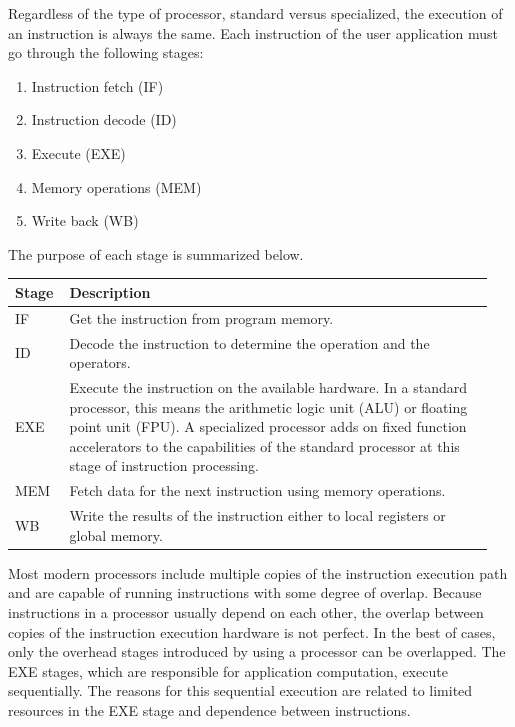 \par Regardless of the type of processor, standard versus specialized, the execution of an
instruction is always the same. Each instruction of the user application must go through the
following stages:
\begin{enumerate}
  \item Instruction fetch (IF)
  \item Instruction decode (ID)
  \item Execute (EXE)
  \item Memory operations (MEM)
  \item Write back (WB)
\end{enumerate}
The purpose of each stage is summarized below.
\begin{table}[H]
  \begin{tabular}{|p{0.1\linewidth} | p{0.85\linewidth}|}
  \hline
  \textbf{Stage} & \textbf{Description}                                                               \\ \hline
  IF             & Get the instruction from program memory.                                           \\ \hline
  ID             & Decode the instruction to determine the operation and the operators.             \\ \hline
  EXE            & Execute the instruction on the available hardware. In a standard processor, this means the arithmetic logic unit (ALU) or floating point unit (FPU). A specialized processor adds on fixed function accelerators to the capabilities of the standard processor at this stage of instruction processing. \\ \hline
  MEM            & Fetch data for the next instruction using memory operations.                     \\ \hline
  WB             & Write the results of the instruction either to local registers or global memory. \\ \hline
  \end{tabular}
\end{table}

Most modern processors include multiple copies of the instruction execution path and are
capable of running instructions with some degree of overlap. Because instructions in a
processor usually depend on each other, the overlap between copies of the instruction
execution hardware is not perfect. In the best of cases, only the overhead stages introduced
by using a processor can be overlapped. The EXE stages, which are responsible for
application computation, execute sequentially. The reasons for this sequential execution are
related to limited resources in the EXE stage and dependence between instructions.

